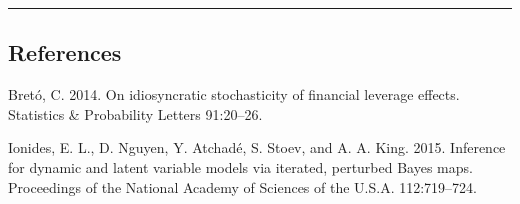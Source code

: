 \documentclass[]{article}
\begin{document}
\begin{center}\rule{0.5\linewidth}{\linethickness}\end{center}

\subsection*{References}\label{references}

\hypertarget{refs}{}
\hypertarget{ref-breto14}{}
Bretó, C. 2014. On idiosyncratic stochasticity of financial leverage
effects. Statistics \& Probability Letters 91:20--26.

\hypertarget{ref-ionides15}{}
Ionides, E. L., D. Nguyen, Y. Atchadé, S. Stoev, and A. A. King. 2015.
Inference for dynamic and latent variable models via iterated, perturbed
Bayes maps. Proceedings of the National Academy of Sciences of the
U.S.A. 112:719--724.
\end{document}
